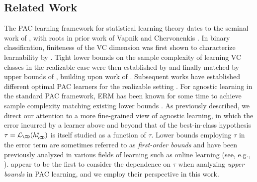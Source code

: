 \subsection{Related Work}

The PAC learning framework for statistical learning theory dates to the seminal work of \citet{valiant1984theory}, with roots in prior work of Vapnik and Chervonenkis \citep{vapnik1964class, vapnik1974theory}. In binary classification, finiteness of the VC dimension was first shown to characterize learnability by \citet{blumer1989learnability}. Tight lower bounds on the sample complexity of learning VC classes in the realizable case were then established by \citet{ehrenfeucht1989general} and finally matched by upper bounds of \citet{hanneke2016optimal}, building upon  work of \citet{simon2015almost}. Subsequent works have established different optimal PAC learners for the realizable setting \citet{aden2023optimal, baggingoptimal,aden2024majority}.
For agnostic learning in the standard PAC framework, ERM has been known for some time to achieve sample complexity matching existing lower bounds \citep{haussler1992decision, boucheron2005theory, anthony2009neural}. As previously described, we direct our attention to a more fine-grained view of agnostic learning, in which the error incurred by a learner above and beyond that of the best-in-class hypothesis $\tau = \ls_\CD(h^*_\CD)$ is itself studied as a function of $\tau$. Lower bounds employing $\tau$ in the error term are sometimes referred to as \emph{first-order bounds} and have been previously analyzed in various fields of learning such as online learning (see, e.g., \citet{wagenmaker2022first}). \citet{hanneke2024revisiting} appear to be the first to consider the dependence on $\tau$ when analyzing \emph{upper bounds} in PAC learning, and we employ their perspective in this work.
